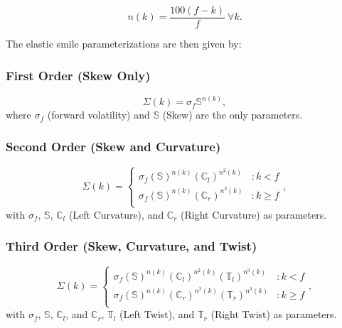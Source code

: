 \documentclass[12pt, a4paper, notitlepage]{article}
\numberwithin{equation}{subsection}
\numberwithin{figure}{subsection}
\numberwithin{table}{subsection}
\begin{document}
\begin{equation*}
	n(k) = 	\frac{100\left(f-k\right)}{f} \ \forall k.
\end{equation*}

The elastic smile parameterizations are then given by:

\subsubsection*{First Order (Skew Only)}
\begin{equation}
	\Sigma(k) = \sigma_f\mathbb{S}^{n(k)} \label{FirstOrderSmile},
\end{equation}
where $\sigma_f$ (forward volatility) and $\mathbb{S}$ (Skew) are the only parameters.

\subsubsection*{Second Order (Skew and Curvature)}
\begin{equation}
\Sigma(k) = \begin{cases}
			\sigma_f\left(\mathbb{S}\right)^{n(k)}\left(\mathbb{C}_l\right)^{n^{2}(k)} & : k < f	\\
            \sigma_f\left(\mathbb{S}\right)^{n(k)}\left(\mathbb{C}_r\right)^{n^{2}(k)} & : k \geq f	\\
        \end{cases},
\label{SecondOrderSmile}
\end{equation}
with $\sigma_f$, $\mathbb{S}$, $\mathbb{C}_l$ (Left Curvature), and $\mathbb{C}_r$ (Right Curvature) as parameters.

\subsubsection*{Third Order (Skew, Curvature, and Twist)}
\begin{equation}
\Sigma(k) = \begin{cases}
			\sigma_f\left(\mathbb{S}\right)^{n(k)}\left(\mathbb{C}_l\right)^{n^{2}(k)}\left(\mathbb{T}_l\right)^{n^{3}(k)} & : k < f	\\
            \sigma_f\left(\mathbb{S}\right)^{n(k)}\left(\mathbb{C}_r\right)^{n^{2}(k)}\left(\mathbb{T}_r\right)^{n^{3}(k)} & : k \geq f	\\
        \end{cases},
\label{ThirdOrderSmile}
\end{equation}
with $\sigma_f$, $\mathbb{S}$, $\mathbb{C}_l$, and $\mathbb{C}_r$, $\mathbb{T}_l$ (Left Twist), and $\mathbb{T}_r$ (Right Twist) as parameters.
\end{document}

